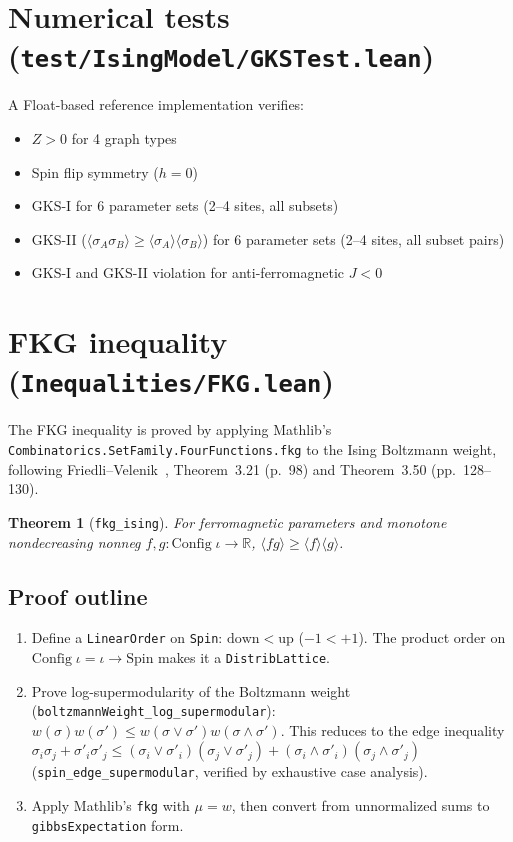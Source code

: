 \documentclass[a4paper,11pt]{article}
\newtheorem{theorem}{Theorem}
\begin{document}
\section{Numerical tests (\texttt{test/IsingModel/GKSTest.lean})}

A Float-based reference implementation verifies:
\begin{itemize}
  \item $Z > 0$ for 4 graph types
  \item Spin flip symmetry ($h = 0$)
  \item GKS-I for 6 parameter sets (2--4 sites, all subsets)
  \item GKS-II ($\langle\sigma_A\sigma_B\rangle \geq
    \langle\sigma_A\rangle\langle\sigma_B\rangle$)
    for 6 parameter sets (2--4 sites, all subset pairs)
  \item GKS-I and GKS-II violation for anti-ferromagnetic $J < 0$
\end{itemize}

\section{FKG inequality (\texttt{Inequalities/FKG.lean})}

The FKG inequality is proved by applying Mathlib's
\texttt{Combinatorics.SetFamily.FourFunctions.fkg} to the Ising Boltzmann
weight, following Friedli--Velenik~\cite{friedli-velenik}, Theorem~3.21
(p.~98) and Theorem~3.50 (pp.~128--130).

\begin{theorem}[\texttt{fkg\_ising}]
For ferromagnetic parameters and monotone nondecreasing nonneg
$f, g : \mathrm{Config}\;\iota \to \mathbb{R}$,
$\langle fg \rangle \geq \langle f \rangle \langle g \rangle$.
\end{theorem}

\subsection{Proof outline}
\begin{enumerate}
\item Define a \texttt{LinearOrder} on \texttt{Spin}: $\mathrm{down} < \mathrm{up}$
  ($-1 < +1$). The product order on $\mathrm{Config}\;\iota = \iota \to
  \mathrm{Spin}$ makes it a \texttt{DistribLattice}.
\item Prove log-supermodularity of the Boltzmann weight
  (\texttt{boltzmannWeight\_log\_supermodular}):
  $w(\sigma)w(\sigma') \leq w(\sigma \vee \sigma')w(\sigma \wedge \sigma')$.
  This reduces to the edge inequality
  $\sigma_i\sigma_j + \sigma'_i\sigma'_j \leq
  (\sigma_i \vee \sigma'_i)(\sigma_j \vee \sigma'_j) +
  (\sigma_i \wedge \sigma'_i)(\sigma_j \wedge \sigma'_j)$
  (\texttt{spin\_edge\_supermodular}, verified by exhaustive case analysis).
\item Apply Mathlib's \texttt{fkg} with $\mu = w$, then convert from
  unnormalized sums to \texttt{gibbsExpectation} form.
\end{enumerate}
\end{document}
